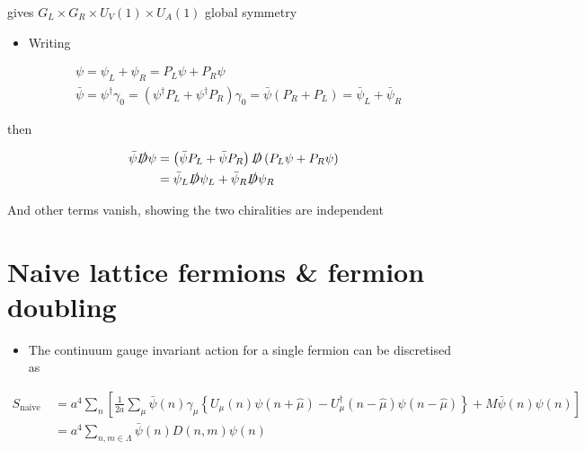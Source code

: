 gives \(G_{L} \times G_{R} \times U_{V}(1) \times U_{A}(1)\) global symmetry

\begin{itemize}
  \item Writing
\end{itemize}

\begin{equation}
\begin{aligned}
& \psi=\psi_{L}+\psi_{R}=P_{L} \psi+ P_{R} \psi \\
& \bar{\psi}=\psi^{\dagger} \gamma_{0}=\left(\psi^\dagger P_{L}+\psi^\dagger P_{R}\right) \gamma_{0}=\bar{\psi}\left(P_{R}+P_{L}\right)=\bar{\psi}_{L}+\bar{\psi}_{R}
\end{aligned}
\end{equation}

then

\begin{equation}
\begin{aligned}
\bar{\psi} \slashed{D} \psi & =\left(\bar{\psi}{P_{L}}+\bar{\psi} P_{R}\right) \slashed{D}\left(P_{L} \psi+P_{R} \psi\right) \\
& =\bar{\psi}_{L} \slashed{D} \psi_{L}+\bar{\psi}_{R} \slashed{D} \psi_{R}
\end{aligned}
\end{equation}

And other terms vanish, showing the two chiralities are independent\\

\section{Naive lattice fermions \& fermion doubling}

\begin{itemize}
  \item The continuum gauge invariant action for a single fermion can be discretised as
\end{itemize}

\begin{equation}
\begin{aligned}
S_{\text {naive }} & =a^{4} \sum_{n}\left[\frac{1}{2 a } \sum_{\mu} \bar{\psi}(n) \gamma_{\mu}\left\{U_{\mu}(n) \psi(n+\hat{\mu})-U_{\mu}^{\dagger}(n-\hat{\mu}) \psi(n-\hat{\mu})\right\}+M \bar{\psi}(n) \psi(n)\right] \\
& =a^{4} \sum_{n, m \in \Lambda} \bar{\psi}(n) D(n, m) \psi(n)
\end{aligned}
\end{equation}

